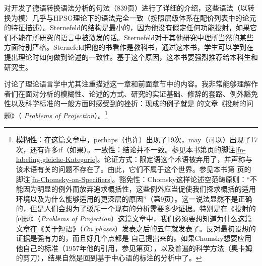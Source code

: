 { 对开发了德语转换语法分析的句法（839页）进行了详细的介绍，这些语法（以转换为模）几乎与HPSG理论下的语法完全一致（按照层级体系在配价列表中的论元的特征描述）。Sternefeld的结构是最小的，因为他没有假定任何功能投射，如果它们不能在所研究的语言中被激发的话。Sternefeld对于其他研究中理所当然的某些方面特别严格。Sternefeld把他的书看作是教科书，通过这本书，学生可以学到在提出理论时如何做到论述的一致性。基于这个原因，这本书要强烈推荐给本科生和研究生。

 \citet{SR2012a}讨论了理论语言学中尤其注重描述这一章和前面章节中的内容。我非常能够理解作者们在面对分析的模糊性、论述的方式、研究的实证基础、修辞的套路、例外豁免性以及科学标准的一般方面时感受到的挫折：现成的例子就是 \citet{Chomsky2013a}的文章《投射的问题》（ \emph{Problems of Projection}）。\footnote{%
  模糊性：在这篇文章中，perhaps（也许）出现了19次，may（可以）出现了17次，还有许多if（如果）。一致性：结论并不一致。参见本书第\pageref{fn-labeling-gleiche-Kategorie}页的脚注\ref{fn-labeling-gleiche-Kategorie}。论证方式：限定语这个术语被弃用了，并声称与该术语有关的问题不存在了。由此，它们不属于这个世界。参见本书第\pageref{fn-Chomsky-on-Specifiers}
  页的脚注\ref{fn-Chomsky-on-Specifiers}。豁免性：Chomsky这样论述空范畴原则：“不能因为明显的例外而放弃追求概括性，这些例外应当促使我们探求概括的适用环境以及为什么能够适用的更深层的原因”（第9页）。这一说法显然不是正确的，但是人们会想为了驳斥一个现有的分析需要多少证据。特别是在《投射的问题》（\emph{Problems of Projection}）这篇文章中，我们必须要想知道为什么这篇文章在《关于短语》（\emph{On phases}）发表之后的五年就发表了。反对最初设想的证据是强有力的，而且好几个点都是 \citet{Chomsky2013a}自己提出来的。如果Chomsky想要应用他自己的标准（1957年他的引用，参见第\pageref{quote-Chomsky-Formalisierung}页），以及普遍的科学方法（奥卡姆的剪刀），结果自然是回到基于中心语的标注的分析中了。
  
}}
